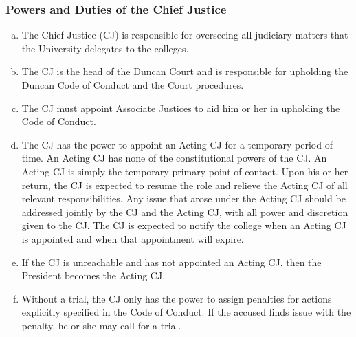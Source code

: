 \documentclass[USletter,12pt]{article}
\begin{document}
\begin{enumerate}[(a)]
\subsubsection{Powers and Duties of the Chief Justice}
\begin{enumerate}[(a)]
\item The Chief Justice (CJ) is responsible for overseeing all judiciary matters that the University delegates to the colleges.
\item The CJ is the head of the Duncan Court and is responsible for upholding the Duncan Code of Conduct and the Court procedures.
\item The CJ must appoint Associate Justices to aid him or her in upholding the Code of Conduct.
\item The CJ has the power to appoint an Acting CJ for a temporary period of time.  An Acting CJ has none of the constitutional powers of the CJ.  An Acting CJ is simply the temporary primary point of contact.  Upon his or her return, the CJ is expected to resume the role and relieve the Acting CJ of all relevant responsibilities. Any issue that arose under the Acting CJ should be addressed jointly by the CJ and the Acting CJ, with all power and discretion given to the CJ. The CJ is expected to notify the college when an Acting CJ is appointed and when that appointment will expire.
\item If the CJ is unreachable and has not appointed an Acting CJ, then the President becomes the Acting CJ.
\item Without a trial, the CJ only has the power to assign penalties for actions explicitly specified in the Code of Conduct.  If the accused finds issue with the penalty, he or she may call for a trial.
\end{enumerate}


\end{enumerate}
\end{document}
